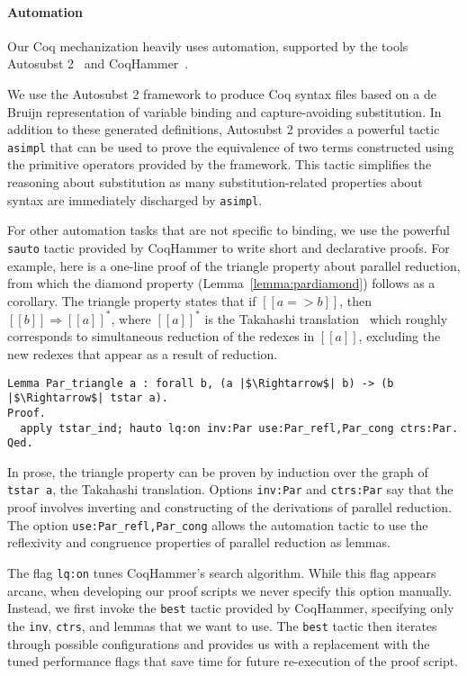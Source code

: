 \documentclass[\ifpublic nolinenum\else\fi,online,OA]{jfp}
\theoremstyle{definition}
\begin{document}
\paragraph{Automation}
\label{sec:automation}
Our Coq mechanization heavily uses automation, supported by the tools
Autosubst 2~\citep{autosubst2} and CoqHammer~\citep{czajka2018hammer}.

We use the Autosubst 2 framework to produce Coq syntax files based on a de
Bruijn representation of variable binding and capture-avoiding substitution.
In addition to these generated definitions, Autosubst 2 provides a powerful
tactic \texttt{asimpl} that can be used to prove the equivalence of two terms
constructed using the primitive operators provided by the framework. This
tactic simplifies the reasoning about substitution as many
substitution-related properties about syntax are immediately discharged by
\texttt{asimpl}.

For other automation tasks that are not specific to binding, we use
the powerful \texttt{sauto} tactic provided by CoqHammer to write
short and declarative proofs. For example, here is a one-line proof of
the triangle property about parallel reduction, from which the diamond
property (Lemma~\ref{lemma:pardiamond}) follows as a corollary.
The triangle property states
that if $[[a => b]]$, then $[[b]]\Rightarrow [[a]]^*$, where $[[a]]^*$
is the Takahashi translation~\citep{takahashi-parallel-reduction}
which roughly corresponds to simultaneous reduction of the redexes in
$[[a]]$, excluding the new redexes that appear as a result of
reduction.
\begin{verbatim}
Lemma Par_triangle a : forall b, (a |$\Rightarrow$| b) -> (b |$\Rightarrow$| tstar a).
Proof.
  apply tstar_ind; hauto lq:on inv:Par use:Par_refl,Par_cong ctrs:Par.
Qed.
\end{verbatim}
In prose, the triangle property can be proven by induction over the graph of
\texttt{tstar a}, the Takahashi translation. Options \texttt{inv:Par}
and \texttt{ctrs:Par} say that the proof involves inverting and constructing
of the derivations of parallel reduction. The option
\texttt{use:Par\_refl,Par\_cong} allows the automation tactic to use the
reflexivity and congruence properties of parallel reduction as lemmas.

The flag \texttt{lq:on} tunes CoqHammer's search algorithm.  While this flag
appears arcane, when developing our proof scripts we never specify this option
manually. Instead, we first invoke the \texttt{best} tactic provided by
CoqHammer, specifying only the \texttt{inv}, \texttt{ctrs}, and lemmas that we
want to use. The \texttt{best} tactic then iterates through possible
configurations and provides us with a replacement with the tuned performance
flags that save time for future re-execution of the proof script.
\end{document}
